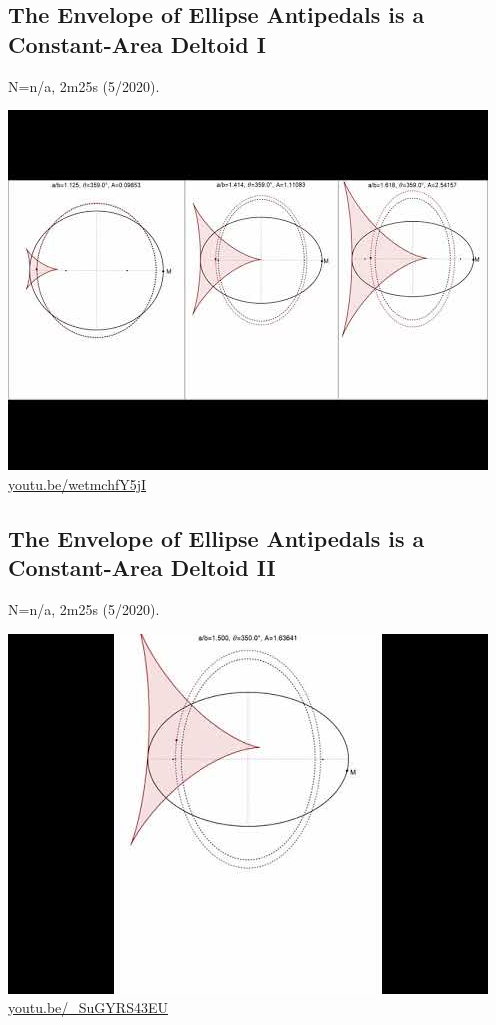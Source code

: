 \documentclass[12pt]{amsart}
\begin{document}
\subsection{The Envelope of Ellipse Antipedals is a Constant-Area Deltoid I}
\label{vid:wetmchfY5jI}
\noindent N=n/a, 2m25s (5/2020). 
\begin{center}\includegraphics[width=.5\textwidth]{pics/wetmchfY5jI.jpg} \\ 
\href{https://youtu.be/wetmchfY5jI}{\url{youtu.be/wetmchfY5jI}}\end{center}
% 

\subsection{The Envelope of Ellipse Antipedals is a Constant-Area Deltoid II}
\label{vid:_SuGYRS43EU}
\noindent N=n/a, 2m25s (5/2020). 
\begin{center}\includegraphics[width=.5\textwidth]{pics/_SuGYRS43EU.jpg} \\ 
\href{https://youtu.be/_SuGYRS43EU}{\url{youtu.be/\_SuGYRS43EU}}\end{center}
% 
\end{document}
